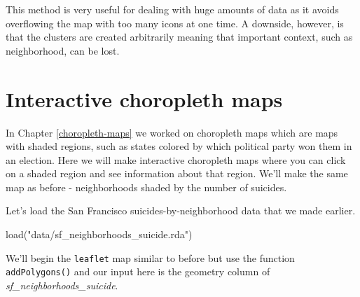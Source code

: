 \documentclass[
]{krantz}
\makeatletter
\newenvironment{Shaded}{\begin{snugshade}}{\end{snugshade}}
\newcommand{\AttributeTok}[1]{\textcolor[rgb]{0.61,0.61,0.61}{#1}}
\newcommand{\CommentTok}[1]{\textcolor[rgb]{0.37,0.37,0.37}{\textit{#1}}}
\newcommand{\FunctionTok}[1]{\textcolor[rgb]{0,0,0}{#1}}
\newcommand{\NormalTok}[1]{#1}
\newcommand{\SpecialCharTok}[1]{\textcolor[rgb]{0,0,0}{#1}}
\newcommand{\StringTok}[1]{\textcolor[rgb]{0.5,0.5,0.5}{#1}}
\newenvironment{kframe}{%
\medskip{}
\setlength{\fboxsep}{.8em}
 \def\at@end@of@kframe{}%
 \ifinner\ifhmode%
  \def\at@end@of@kframe{\end{minipage}}%
  \begin{minipage}{\columnwidth}%
 \fi\fi%
 \def\FrameCommand##1{\hskip\@totalleftmargin \hskip-\fboxsep
 \colorbox{shadecolor}{##1}\hskip-\fboxsep
     \hskip-\linewidth \hskip-\@totalleftmargin \hskip\columnwidth}%
 \MakeFramed {\advance\hsize-\width
   \@totalleftmargin\z@ \linewidth\hsize
   \@setminipage}}%
 {\par\unskip\endMakeFramed%
 \at@end@of@kframe}
\renewenvironment{Shaded}{\begin{kframe}}{\end{kframe}}
\makeatother
\begin{document}
This method is very useful for dealing with huge amounts of data as it avoids overflowing the map with too many icons at one time. A downside, however, is that the clusters are created arbitrarily meaning that important context, such as neighborhood, can be lost.

\hypertarget{interactive-choropleth-maps}{%
\section{Interactive choropleth maps}\label{interactive-choropleth-maps}}

In Chapter \ref{choropleth-maps} we worked on choropleth maps which are maps with shaded regions, such as states colored by which political party won them in an election. Here we will make interactive choropleth maps where you can click on a shaded region and see information about that region. We'll make the same map as before - neighborhoods shaded by the number of suicides.

Let's load the San Francisco suicides-by-neighborhood data that we made earlier.

\begin{Shaded}
\begin{Highlighting}[]
\FunctionTok{load}\NormalTok{(}\StringTok{"data/sf\_neighborhoods\_suicide.rda"}\NormalTok{)}
\end{Highlighting}
\end{Shaded}

We'll begin the \texttt{leaflet} map similar to before but use the function \texttt{addPolygons()} and our input here is the geometry column of \emph{sf\_neighborhoods\_suicide}.

\begin{Shaded}
\end{Shaded}
\end{document}
